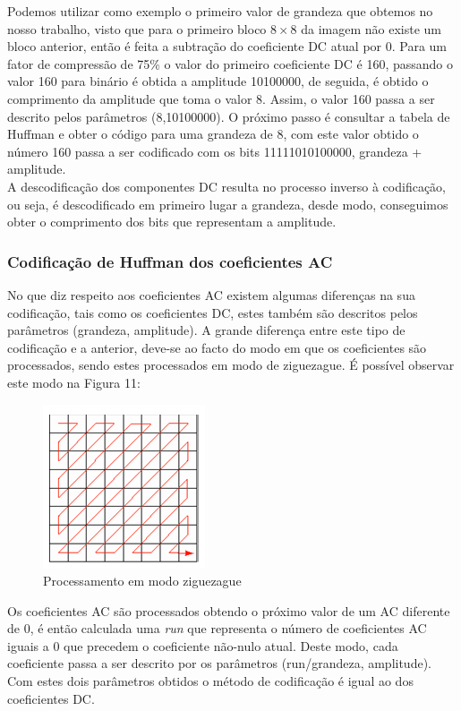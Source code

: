 \documentclass[12pt,a4paper]{article}
\begin{document}
Podemos utilizar como exemplo o primeiro valor de grandeza que obtemos no nosso trabalho, visto que para o primeiro bloco $8\times 8$ da imagem não existe um bloco anterior, então é feita a subtração do coeficiente DC atual por 0. Para um fator de compressão de 75\% o valor do primeiro coeficiente DC é 160, passando o valor 160 para binário é obtida a amplitude 10100000, de seguida, é obtido o comprimento da amplitude que toma o valor 8. Assim, o valor 160 passa a ser descrito pelos parâmetros (8,10100000). O próximo passo é consultar a tabela de Huffman e obter o código para uma grandeza de 8, com este valor obtido o número 160 passa a ser codificado com os bits 11111010100000, grandeza + amplitude. \\
A descodificação dos componentes DC resulta no processo inverso à codificação, ou seja, é descodificado em primeiro lugar a grandeza, desde modo, conseguimos obter o comprimento dos bits que representam a amplitude.

\subsubsection{Codificação de Huffman dos coeficientes AC}
No que diz respeito aos coeficientes AC existem algumas diferenças na sua codificação, tais como os coeficientes DC, estes também são descritos pelos parâmetros (grandeza, amplitude). A grande diferença entre este tipo de codificação e a anterior, deve-se ao facto do modo em que os coeficientes são processados, sendo estes processados em modo de ziguezague. É possível observar este modo na Figura 11:
\newpage
\begin{figure}[h]
\centering
\includegraphics[width=.3\linewidth]{imagens/zigzag.png}
\caption{Processamento em modo ziguezague}
\end{figure}

Os coeficientes AC são processados obtendo o próximo valor de um AC diferente de 0, é então calculada uma \textit{run} que representa o número de coeficientes AC iguais a 0 que precedem o coeficiente não-nulo atual. Deste modo, cada coeficiente passa a ser descrito por os parâmetros (run/grandeza, amplitude). Com estes dois parâmetros obtidos o método de codificação é igual ao dos coeficientes DC. \\
\end{document}
